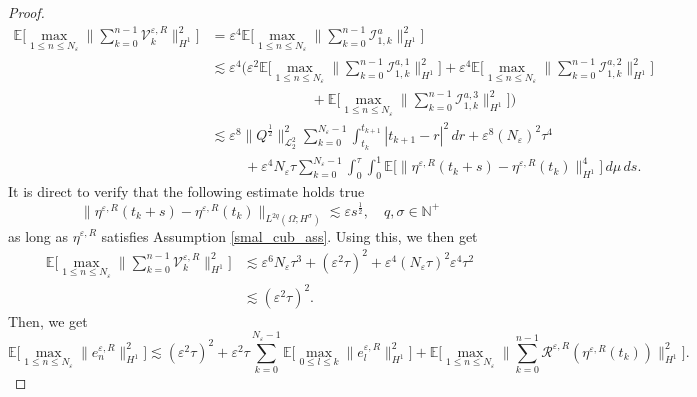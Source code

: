 \documentclass[a4paper]{amsart}
\begin{document}
\begin{proof}
\begin{align*}
    \mathbb{E}\big[\max_{1\le n\le N_\varepsilon}\|\sum_{k=0}^{n-1}\mathcal{V}^{\varepsilon,R}_k\|^{2}_{H^1}\big]&= \varepsilon^4\mathbb{E}\big[\max_{1\le n\le N_\varepsilon}\|\sum_{k=0}^{n-1}\mathcal{I}_{1,k}^a\|^{2}_{H^1}\big]\\
    &\lesssim \varepsilon^4\big(\varepsilon^{2}\mathbb{E}\big[\max_{1\le n \le N_\varepsilon}\|\sum_{k=0}^{n-1}\mathcal{I}_{1,k}^{a,1}\|^{2}_{H^1}\big]+\varepsilon^{4}\mathbb{E}\big[\max_{1\le n\le N_\varepsilon}\|\sum_{k=0}^{n-1}\mathcal{I}_{1,k}^{a,2}\|^{2}_{H^1}\big]\\
    &\hspace{3cm}+\mathbb{E}\big[\max_{1\le n\le N_\varepsilon}\|\sum_{k=0}^{n-1}\mathcal{I}_{1,k}^{a,3}\|^{2}_{H^1}\big]\big)\\
    &\lesssim  \varepsilon^{8}\|Q^{\frac{1}{2}}\|^{2}_{\mathcal{L}_2^2}\sum_{k=0}^{N_\varepsilon-1} \int_{t_k}^{t_{k+1}} |t_{k+1}-r|^2\,dr
    + \varepsilon^{8}(N_\varepsilon)^{2} \tau^{4}\\
    &\hspace{1cm}+\varepsilon^{4}N_\varepsilon \tau\sum_{k=0}^{N_\varepsilon-1}\int_0^\tau \int_0^1 \mathbb{E}\big[\|\eta^{\varepsilon,R}(t_k+s)-\eta^{\varepsilon,R}(t_k)\|^{4}_{H^1}\big]\,d\mu\,ds.
\end{align*}
It is direct to verify that the following estimate holds true
\begin{equation}
    \label{t_reg_cub}
\|\eta^{\varepsilon,R}(t_k+s)-\eta^{\varepsilon,R}(t_k)\|_{L^{2q}(\Omega; H^\sigma)}\lesssim \varepsilon s^{\frac{1}{2}}, \quad q,\sigma\in\mathbb{N}^+
\end{equation}
as long as $\eta^{\varepsilon,R}$ satisfies Assumption \ref{smal_cub_ass}. Using this, we then get
\begin{align*}
    \mathbb{E}\big[\max_{1\le n\le N_\varepsilon}\|\sum_{k=0}^{n-1}\mathcal{V}^{\varepsilon,R}_k\|^{2}_{H^1}\big]&\lesssim \varepsilon^{6} N_\varepsilon \tau^3+(\varepsilon^2 \tau)^{2}
    +\varepsilon^4(N_\varepsilon\tau)^{2}\varepsilon^{4}\tau^{2}\\
    &\lesssim (\varepsilon^2 \tau)^{2}.
\end{align*}
Then, we get
\begin{equation*}
\mathbb{E}\big[\max_{1\le n \le N_\varepsilon}\|e^{\varepsilon,R}_{n}\|^{2}_{H^1}\big] \lesssim  (\varepsilon^2 \tau)^{2}+\varepsilon^2 \tau \sum_{k=0}^{N_\varepsilon-1} \mathbb{E}\big[\max_{0\le l\le k}\|e^{\varepsilon,R}_l\|^{2}_{H^1}\big]+
\mathbb{E}\big[\max_{1\le n\le N_\varepsilon}\|\sum_{k=0}^{n-1}\mathcal{R}^{\varepsilon,R}(\eta^{\varepsilon,R}(t_k))\|^{2}_{H^1}\big].

\end{equation*}
\end{proof}
\end{document}
